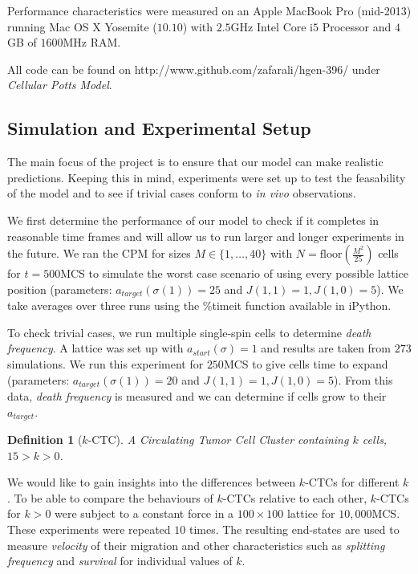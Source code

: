 \documentclass[12pt]{article}
\newtheorem{definition}{Definition}
\begin{document}
Performance characteristics were measured on an Apple MacBook Pro (mid-2013) running Mac OS X Yosemite ($10.10$) with $2.5$GHz Intel Core i$5$ Processor and $4$GB of $1600$MHz RAM.

All code can be found on http://www.github.com/zafarali/hgen-396/ under \emph{Cellular Potts Model}.

\subsection{Simulation and Experimental Setup}
The main focus of the project is to ensure that our model can make realistic predictions. Keeping this in mind, experiments were set up to test the feasability of the model and to see if trivial cases conform to \emph{in vivo} observations. 

We first determine the performance of our model to check if it completes in reasonable time frames and will allow us to run larger and longer experiments in the future. We ran the CPM for sizes $M\in\{1, \ldots , 40\}$ with $N=\text{floor}(\frac{M^2}{25})$ cells for $t=500$MCS to simulate the worst case scenario of using every possible lattice position (parameters: $a_{target}(\sigma(1))=25$ and $J(1,1)=1, J(1,0)=5$). We take averages over three runs using the \%timeit function available in iPython.

To check trivial cases, we run multiple single-spin cells to determine \emph{death frequency}. A lattice was set up with $a_{start}(\sigma)=1$ and results are taken from $273$ simulations. We run this experiment for $250$MCS to give cells time to expand (parameters: $a_{target}(\sigma(1))=20$ and $J(1,1)=1, J(1,0)=5$). From this data, \emph{death frequency} is measured and we can determine if cells grow to their $a_{target}$.

\begin{definition}[$k$-CTC]
A Circulating Tumor Cell Cluster containing $k$ cells, $15>k>0$.
\end{definition}

We would like to gain insights into the differences between $k$-CTCs for different $k$. To be able to compare the behaviours of $k$-CTCs relative to each other, $k$-CTCs for $k>0$ were subject to a constant force in a $100\times100$ lattice for $10,000$MCS. These experiments were repeated $10$ times. The resulting end-states are used to measure \emph{velocity} of their migration and other characteristics such as \emph{splitting frequency} and \emph{survival} for individual values of $k$.
\end{document}
